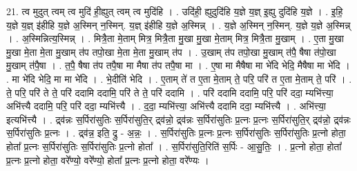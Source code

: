 \documentclass[17pt]{extarticle}
\begin{document}
21. त्व मुदुत् त्वम् त्व मुदि॑ ही॒ह्युत् त्वम् त्व मुदि॑हि । . उदि॑ही॒ ह्युदुदि॑हि य॒ज्ञे य॒ज्ञ् इ॒ह्यु दुदि॑हि य॒ज्ञे । . इ॒हि॒ य॒ज्ञे य॒ज्ञ् इ॑हीहि य॒ज्ञे अ॒स्मिन् न॒स्मिन्. य॒ज्ञ् इ॑हीहि य॒ज्ञे अ॒स्मिन्न् । . य॒ज्ञे अ॒स्मिन् न॒स्मिन्. य॒ज्ञे य॒ज्ञे अ॒स्मिन्न् । . अ॒स्मिन्नित्य॒स्मिन्न् । . मित्रै॒ता मे॒ताम् मित्र॒ मित्रै॒ता मु॒खा मु॒खा मे॒ताम् मित्र॒ मित्रै॒ता मु॒खाम् । . ए॒ता मु॒खा मु॒खा मे॒ता मे॒ता मु॒खाम् त॑प तपो॒खा मे॒ता मे॒ता मु॒खाम् त॑प । . उ॒खाम् त॑प तपो॒खा मु॒खाम् त॑पै॒ षैषा त॑पो॒खा मु॒खाम् त॑पै॒षा । . त॒पै॒ षैषा त॑प तपै॒षा मा मैषा त॑प तपै॒षा मा । . ए॒षा मा मैषैषा मा भे॑दि भेदि॒ मैषैषा मा भे॑दि । . मा भे॑दि भेदि॒ मा मा भे॑दि । . भे॒दीति॑ भेदि । . ए॒ताम् ते॑ त ए॒ता मे॒ताम् ते॒ परि॒ परि॑ त ए॒ता मे॒ताम् ते॒ परि॑ । . ते॒ परि॒ परि॑ ते ते॒ परि॑ ददामि ददामि॒ परि॑ ते ते॒ परि॑ ददामि । . परि॑ ददामि ददामि॒ परि॒ परि॑ ददा॒ म्यभि॑त्त्या॒ अभि॑त्त्यै ददामि॒ परि॒ परि॑ ददा॒ म्यभि॑त्त्यै । . द॒दा॒ म्यभि॑त्त्या॒ अभि॑त्त्यै ददामि ददा॒ म्यभि॑त्त्यै । . अभि॑त्त्या॒ इत्यभि॑त्त्यै । . द्र्व॑न्नः स॒र्पिरा॑सुतिः स॒र्पिरा॑सुति॒र् द्र्व॑न्नो॒ द्र्व॑न्नः स॒र्पिरा॑सुतिः प्र॒त्नः प्र॒त्नः स॒र्पिरा॑सुति॒र् द्र्व॑न्नो॒ द्र्व॑न्नः स॒र्पिरा॑सुतिः प्र॒त्नः । . द्र्व॑न्न॒ इति॒ द्रु - अ॒न्नः॒ । . स॒र्पिरा॑सुतिः प्र॒त्नः प्र॒त्नः स॒र्पिरा॑सुतिः स॒र्पिरा॑सुतिः प्र॒त्नो होता॒ होता᳚ प्र॒त्नः स॒र्पिरा॑सुतिः स॒र्पिरा॑सुतिः प्र॒त्नो होता᳚ । . स॒र्पिरा॑सुति॒रिति॑ स॒र्पिः - आ॒सु॒तिः॒ । . प्र॒त्नो होता॒ होता᳚ प्र॒त्नः प्र॒त्नो होता॒ वरे᳚ण्यो॒ वरे᳚ण्यो॒ होता᳚ प्र॒त्नः प्र॒त्नो होता॒ वरे᳚ण्यः । \newline
\end{document}
